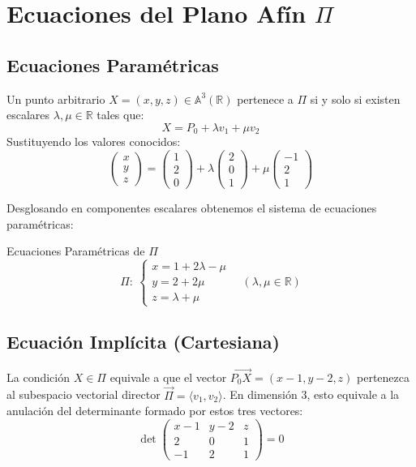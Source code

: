 \documentclass[11pt,a4paper]{article}
\begin{document}
\section{Ecuaciones del Plano Afín $\Pi$}

\subsection{Ecuaciones Paramétricas}
Un punto arbitrario $X = (x, y, z) \in \mathbb{A}^3(\mathbb{R})$ pertenece a $\Pi$ si y solo si existen escalares $\lambda, \mu \in \mathbb{R}$ tales que:
\[
X = P_0 + \lambda v_1 + \mu v_2
\]
Sustituyendo los valores conocidos:
\[
\begin{pmatrix} x \\ y \\ z \end{pmatrix} = \begin{pmatrix} 1 \\ 2 \\ 0 \end{pmatrix} + \lambda \begin{pmatrix} 2 \\ 0 \\ 1 \end{pmatrix} + \mu \begin{pmatrix} -1 \\ 2 \\ 1 \end{pmatrix}
\]

Desglosando en componentes escalares obtenemos el sistema de ecuaciones paramétricas:
\begin{solbox}{Ecuaciones Paramétricas de $\Pi$}
\[
\Pi:\ \begin{cases}
x = 1 + 2\lambda - \mu \\
y = 2 + 2\mu \\
z = \lambda + \mu
\end{cases} \quad (\lambda, \mu \in \mathbb{R})
\]
\end{solbox}

\subsection{Ecuación Implícita (Cartesiana)}
La condición $X \in \Pi$ equivale a que el vector $\vec{P_0 X} = (x-1, y-2, z)$ pertenezca al subespacio vectorial director $\vec{\Pi} = \langle v_1, v_2 \rangle$. En dimensión 3, esto equivale a la anulación del determinante formado por estos tres vectores:
\[
\det \begin{pmatrix}
x - 1 & y - 2 & z \\
2 & 0 & 1 \\
-1 & 2 & 1
\end{pmatrix} = 0
\]
\end{document}
